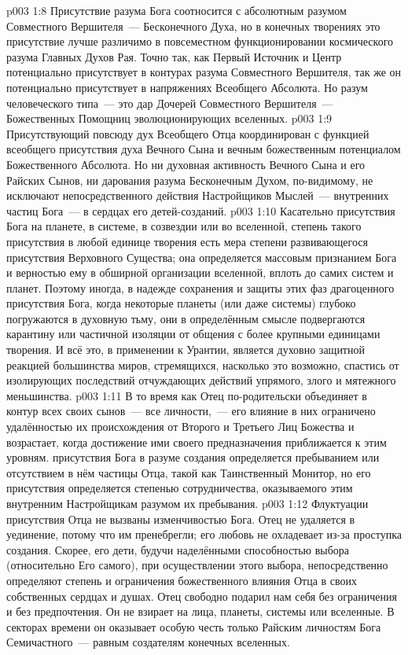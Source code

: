 \vs p003 1:8 Присутствие разума Бога соотносится с абсолютным разумом Совместного Вершителя~--- Бесконечного Духа, но в конечных творениях это присутствие лучше различимо в повсеместном функционировании космического разума Главных Духов Рая. Точно так, как Первый Источник и Центр потенциально присутствует в контурах разума Совместного Вершителя, так же он потенциально присутствует в напряжениях Всеобщего Абсолюта. Но разум человеческого типа~--- это дар Дочерей Совместного Вершителя~--- Божественных Помощниц эволюционирующих вселенных.
\vs p003 1:9 Присутствующий повсюду дух Всеобщего Отца координирован с функцией всеобщего присутствия духа Вечного Сына и вечным божественным потенциалом Божественного Абсолюта. Но ни духовная активность Вечного Сына и его Райских Сынов, ни дарования разума Бесконечным Духом, по\hyp{}видимому, не исключают непосредственного действия Настройщиков Мыслей~--- внутренних частиц Бога~--- в сердцах его детей\hyp{}созданий.
\vs p003 1:10 Касательно присутствия Бога на планете, в системе, в созвездии или во вселенной, степень такого присутствия в любой единице творения есть мера степени развивающегося присутствия Верховного Существа; она определяется массовым признанием Бога и верностью ему в обширной организации вселенной, вплоть до самих систем и планет. Поэтому иногда, в надежде сохранения и защиты этих фаз драгоценного присутствия Бога, когда некоторые планеты (или даже системы) глубоко погружаются в духовную тьму, они в определённым смысле подвергаются карантину или частичной изоляции от общения с более крупными единицами творения. И всё это, в применении к Урантии, является духовно защитной реакцией большинства миров, стремящихся, насколько это возможно, спастись от изолирующих последствий отчуждающих действий упрямого, злого и мятежного меньшинства.
\vs p003 1:11 \pc В то время как Отец по\hyp{}родительски объединяет в контур всех своих сынов~--- все личности,~--- его влияние в них ограничено удалённостью их происхождения от Второго и Третьего Лиц Божества и возрастает, когда достижение ими своего предназначения приближается к этим уровням.  присутствия Бога в разуме создания определяется пребыванием или отсутствием в нём частицы Отца, такой как Таинственный Монитор, но  его присутствия определяется степенью сотрудничества, оказываемого этим внутренним Настройщикам разумом их пребывания.
\vs p003 1:12 Флуктуации присутствия Отца не вызваны изменчивостью Бога. Отец не удаляется в уединение, потому что им пренебрегли; его любовь не охладевает из\hyp{}за проступка создания. Скорее, его дети, будучи наделёнными способностью выбора (относительно Его самого), при осуществлении этого выбора, непосредственно определяют степень и ограничения божественного влияния Отца в своих собственных сердцах и душах. Отец свободно подарил нам себя без ограничения и без предпочтения. Он не взирает на лица, планеты, системы или вселенные. В секторах времени он оказывает особую честь только Райским личностям Бога Семичастного~--- равным создателям конечных вселенных.
